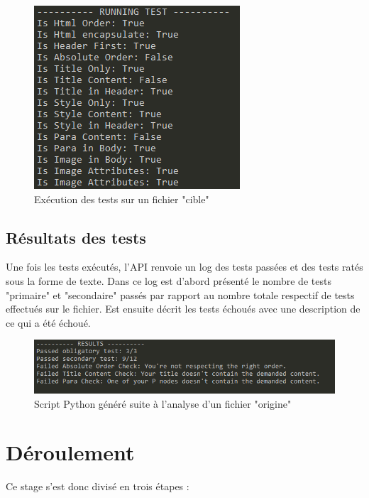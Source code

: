 \begin{figure}[ht]
\centering
\includegraphics[height=0.63\textwidth]{running.png}
\caption{\label{fig:running}Exécution des tests sur un fichier "cible"}
\end{figure}

\subsection{Résultats des tests}

Une fois les tests exécutés, l'API renvoie un log des tests passées et des tests ratés sous la forme de texte. Dans ce log est d'abord présenté le nombre de tests "primaire" et "secondaire" passés par rapport au nombre totale respectif de tests effectués sur le fichier. Est ensuite décrit les tests échoués avec une description de ce qui a été échoué.\\

\begin{figure}[ht]
\centering
\includegraphics[width=1\textwidth]{results.png}
\caption{\label{fig:results}Script Python généré suite à l'analyse d'un fichier "origine"}
\end{figure}

\section{Déroulement}

Ce stage s'est donc divisé en trois étapes :\\

